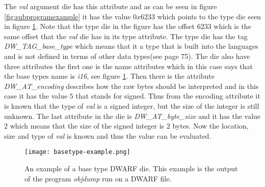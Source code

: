 The \emph{val} argument \gls{die} has this attribute and as can be seen in figure \ref{fig:subprogramexample} it has the value $0x6233$ which points to the type \gls{die} seen in figure \ref{fig:basetypeexample}.
Note that the type \gls{die} in the figure has the offset $6233$ which is the same offset that the \emph{val} \gls{die} has in its type attribute.
The type \gls{die} has the tag \emph{DW\_TAG\_base\_type} which means that it a type that is built into the languages and is not defined in terms of other data types(see \cite{dwarf} page 75).
The \gls{die} also have three attributes the first one is the name attributes which in this case says that the base types name is \emph{i16}, see figure \ref{fig:basetypeexample}.
Then there is the attribute \emph{DW\_AT\_encoding} describes how the raw bytes should be interpreted and in this case it has the value $5$ that stands for signed.
Thus from the encoding attribute it is known that the type of \emph{val} is a signed integer, but the size of the integer is still unknown.
The last attribute in the \gls{die} is \emph{DW\_AT\_byte\_size} and it has the value $2$ which means that the size of the signed integer is $2$ bytes.
Now the location, size and type of \emph{val} is known and thus the value can be evaluated.


\begin{figure}[h]
	\centering
	\texttt{[image: basetype-example.png]}
	\caption{An example of a base type \gls{DWARF} \gls{die}. This example is the output of the program \emph{objdump} run on a \gls{DWARF} file.}
	\label{fig:basetypeexample}
\end{figure}

